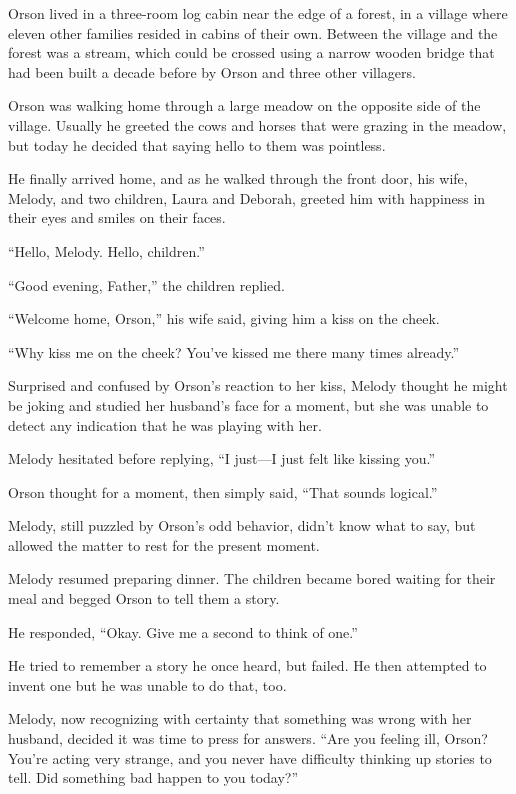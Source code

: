 Orson lived in a three-room log cabin near the edge of a forest, in a village where eleven other families resided in cabins of their own. Between the village and the forest was a stream, which could be crossed using a narrow wooden bridge that had been built a decade before by Orson and three other villagers.

Orson was walking home through a large meadow on the opposite side of the village. Usually he greeted the cows and horses that were grazing in the meadow, but today he decided that saying hello to them was pointless.

He finally arrived home, and as he walked through the front door, his wife, Melody, and two children, Laura and Deborah, greeted him with happiness in their eyes and smiles on their faces.

“Hello, Melody. Hello, children.”

“Good evening, Father,” the children replied.

“Welcome home, Orson,” his wife said, giving him a kiss on the cheek.

“Why kiss me on the cheek? You've kissed me there many times already.”

Surprised and confused by Orson's reaction to her kiss, Melody thought he might be joking and studied her husband's face for a moment, but she was unable to detect any indication that he was playing with her.

Melody hesitated before replying, “I just—I just felt like kissing you.”

Orson thought for a moment, then simply said, “That sounds logical.”

Melody, still puzzled by Orson's odd behavior, didn't know what to say, but allowed the matter to rest for the present moment.

Melody resumed preparing dinner. The children became bored waiting for their meal and begged Orson to tell them a story.

He responded, “Okay. Give me a second to think of one.”

He tried to remember a story he once heard, but failed. He then attempted to invent one but he was unable to do that, too.

Melody, now recognizing with certainty that something was wrong with her husband, decided it was time to press for answers. “Are you feeling ill, Orson? You're acting very strange, and you never have difficulty thinking up stories to tell. Did something bad happen to you today?”

